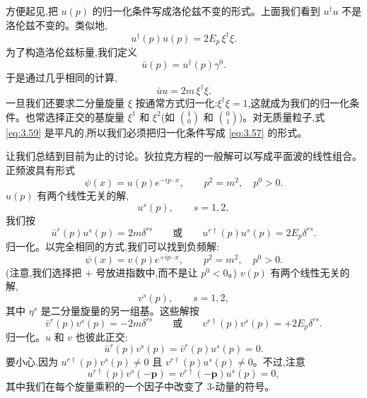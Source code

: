 方便起见,把 $u(p)$ 的归一化条件写成洛伦兹不变的形式。上面我们看到 $u^\dagger u$ 不是洛伦兹不变的。类似地,
\begin{equation}
  u^\dagger(p)u(p) = 2E_p\,\xi^\dagger\xi .
  \label{eq:3.57}
\end{equation}
为了构造洛伦兹标量,我们定义
\begin{equation}
  \bar{u}(p) = u^\dagger(p)\gamma^0 .
  \label{eq:3.58}
\end{equation}
于是通过几乎相同的计算,
\begin{equation}
  \bar{u}u = 2m\,\xi^\dagger\xi .
  \label{eq:3.59}
\end{equation}
一旦我们还要求二分量旋量 $\xi$ 按通常方式归一化:$\xi^\dagger\xi = 1$,这就成为我们的归一化条件。也常选择正交的基旋量 $\xi^1$ 和 $\xi^2$(如 $\binom{1}{0}$ 和 $\binom{0}{1}$)。对无质量粒子,式 \eqref{eq:3.59} 是平凡的,所以我们必须把归一化条件写成 \eqref{eq:3.57} 的形式。

让我们总结到目前为止的讨论。狄拉克方程的一般解可以写成平面波的线性组合。正频波具有形式
\begin{equation}
  \psi(x) = u(p)e^{-ip\cdot x},\qquad p^2 = m^2,\quad p^0>0 .
  \label{eq:3.60}
\end{equation}
$u(p)$ 有两个线性无关的解,
\begin{equation}
  u^s(p),\qquad s = 1, 2,
  \label{eq:3.61}
\end{equation}
我们按
\begin{equation}
  \bar{u}^r(p)u^s(p) = 2m\delta^{rs}
  \qquad\text{或}\qquad
  u^{r\dagger}(p)u^s(p) = 2E_p\delta^{rs}.
  \label{eq:3.62}
\end{equation}
归一化。以完全相同的方式,我们可以找到负频解:
\begin{equation}
  \psi(x) = v(p)e^{+ip\cdot x},\qquad p^2 = m^2,\quad p^0>0 .
  \label{eq:3.63}
\end{equation}
(注意,我们选择把 $+$ 号放进指数中,而不是让 $p^0<0$。) $v(p)$ 有两个线性无关的解,
\begin{equation}
  v^s(p),\qquad s = 1, 2,
  \label{eq:3.64}
\end{equation}
其中 $\eta^s$ 是二分量旋量的另一组基。这些解按
\begin{equation}
  \bar{v}^r(p)v^s(p) = -2m\delta^{rs}
  \qquad\text{或}\qquad
  v^{r\dagger}(p)v^s(p) = +2E_p\delta^{rs}.
  \label{eq:3.65}
\end{equation}
归一化。$u$ 和 $v$ 也彼此正交:
\begin{equation}
  \bar{u}^r(p)v^s(p) = \bar{v}^r(p)u^s(p) = 0 .
  \label{eq:3.66}
\end{equation}
要小心,因为 $u^{r\dagger}(p)v^s(p)\neq 0$ 且 $v^{r\dagger}(p)u^s(p)\neq 0$。不过,注意
\begin{equation}
  u^{r\dagger}(p)v^s(-\mathbf{p}) =
  v^{r\dagger}(-\mathbf{p})u^s(p) = 0 ,
  \label{eq:3.67}
\end{equation}
其中我们在每个旋量乘积的一个因子中改变了 3-动量的符号。

